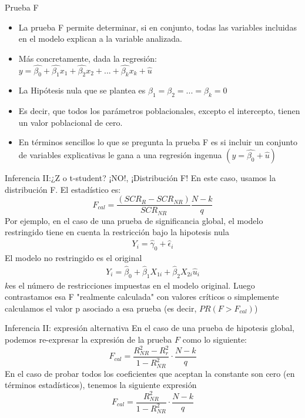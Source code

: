 \begin{frame}{Prueba F}
	\begin{itemize}
		\item La prueba F permite determinar, si en conjunto, todas las variables incluidas en el modelo explican a la variable analizada.
		\item Más concretamente, dada la regresión:\\ $y=\hat{\beta_{0}}+\hat{\beta_{1}}x_{1}+\hat{\beta_{2}}x_{2}+...+\hat{\beta_{k}}x_{k}+\hat{u}$
		\item La Hipótesis nula que se plantea es $\beta_{1}=\beta_{2}=...=\beta_{k}=0$
		\item Es decir, que todos los parámetros poblacionales, excepto el intercepto, tienen un valor poblacional de cero.
		\item En términos sencillos lo que se pregunta la prueba F es si incluir un conjunto de variables explicativas le gana a una regresión ingenua $(y=\hat{\beta_{0}}+\hat{u})$		
	\end{itemize}
\end{frame}
\begin{frame}{Inferencia II:¿Z o t-student? ¡NO!, ¡Distribución F!}
	En este caso, usamos la distribución F. El estadístico es:
		$$F_{cal} = \frac{(SCR_{R}-SCR_{NR})}{SCR_{NR}}\frac{N-k}{q}$$
	Por ejemplo, en el caso de una prueba de significancia global, el modelo restringido tiene en cuenta la restricción bajo la hipotesis nula
		\begin{gather}
			Y_i = \widehat{\gamma}_0 + \widehat{\epsilon}_i \tag{restringido}
		\end{gather}
	El modelo no restringido es el original
		\begin{gather}
			Y_i = \widehat{\beta}_0 + \widehat{\beta}_1 X_{1i} +\widehat{\beta}_2 X_{2i} \widehat{u}_i \tag{no restringido}
		\end{gather}
	$k$es el número de restricciones impuestas en el modelo original. Luego contrastamos esa F "realmente calculada" con valores críticos o simplemente calculamos el valor p asociado a esa prueba (es decir, $PR(F > F_{cal})$)
\end{frame}
\begin{frame}{Inferencia II: expresión alternativa}
	En el caso de una prueba de hipotesis global, podemos re-expresar la expresión de la prueba $F$ como lo siguiente:
		$$F_{cal} = \frac{R_{NR}^2-R_{r}^2}{1-R_{NR}^2}\cdot \frac{N-k}{q}$$
	En el caso de probar todos los coeficientes que aceptan la constante son cero (en términos estadísticos), tenemos la siguiente expresión
		$$F_{cal} = \frac{R_{NR}^2}{1 - R_{NR}^2}\cdot \frac{N-k}{q}$$
\end{frame}
